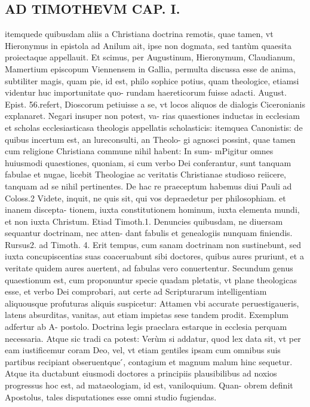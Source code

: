 \documentclass{article}
\begin{document}
\begin{pages}
\section*{AD TIMOTHEVM CAP. I. }
\marginpar{[ p.18 ]}\pstart itemquede quibusdam aliis a Christiana doctrina remotis, quae tamen, vt Hieronymus in epistola ad Anilum ait, ipse non dogmata, sed tantùm quaesita proiectaque  appellauit. Et scimus, per Augustinum, Hieronymum, Claudianum, Mamertium episcopum Viennensem in Gallia, permulta discussa esse de anima, subtiliter magis, quam pie, id est, philo sophice potius, quam theologice, etiamsi videntur huc importunitate quo- rundam haereticorum fuisse adacti. August. Epist. 56.refert, Dioscorum petiuisse a se, vt locos aliquos de dialogis Ciceronianis explanaret. Negari insuper non potest, va- rias quaestiones inductas in ecclesiam et scholas ecclesiasticasa theologis appellatis scholasticis: itemquea Canonistis: de quibus incertum est, an lureconsulti, an Theolo- gi agnosci possint, quae tamen cum religione Christiana commune nihil habent: In sum- mPigitur omnes huiusmodi quaestiones, quoniam, si cum verbo Dei conferantur, sunt tanquam fabulae et nugae, licebit Theologiae ac veritatis Christianae studioso reiicere, tanquam ad se nihil pertinentes. De hac re praeceptum habemus diui Pauli ad Coloss.2 Videte, inquit, ne quis sit, qui vos depraedetur per philosophiam. et inanem discepta-  tionem, iuxta constitutionem hominum, iuxta elementa mundi, et non iuxta Christum.   Etiad Timoth.1. Denuncies quibusdam, ne diuersam sequantur doctrinam, nec atten-   dant fabulis et genealogiis nunquam finiendis. Rursus2. ad Timoth. 4. Erit tempus, cum   sanam doctrinam non sustinebunt, sed iuxta concupiscentias suas coaceruabunt sibi doctores,   quibus aures pruriunt, et a veritate quidem aures auertent, ad fabulas vero conuertentur.    \pend\pstart Secundum genus quaestionum est, cum proponuntur specie quadam pletatis, vt plane theologicas esse, et verbo Dei comprobari, aut certe ad Scripturarum intelligentiam aliquousque  profuturas aliquis suspicetur: Attamen vbi accurate peruestigaueris, latens absurditas, vanitas, aut etiam impietas sese tandem prodit. Exemplum adfertur ab A- postolo. Doctrina legis praeclara estarque  in ecclesia perquam necessaria. Atque  sic tradi ca potest: Verùm si addatur, quod lex data sit, vt per eam iustificemur coram Deo, vel, vt etiam gentiles ipsam cum omnibus suis partibus recipiant obseruentque ́, contagium et magnum malum hinc sequetur. Atque  ita ductabunt eiusmodi doctores a principiis plausibilibus ad noxios progressus hoc est, ad mataeologiam, id est, vaniloquium. Quan- obrem definit Apostolus, tales disputationes esse omni studio fugiendas.  \pend
{}
{}

\end{pages}
\end{document}
